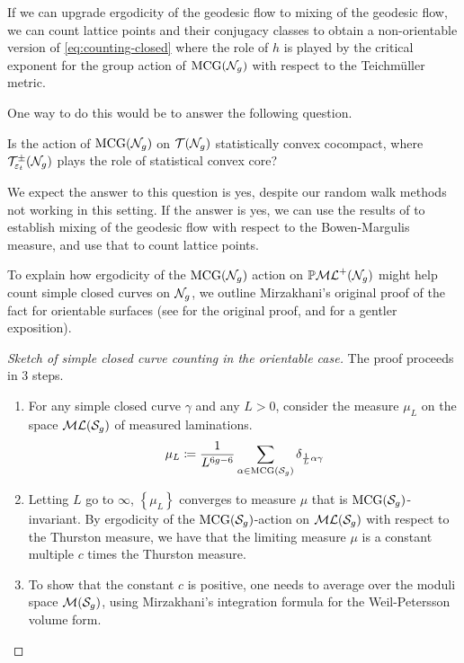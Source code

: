 If we can upgrade ergodicity of the geodesic flow to mixing of the geodesic flow, we can count lattice points and their conjugacy classes to obtain a non-orientable version of \eqref{eq:counting-closed} where the role of $h$ is played by the critical exponent for the group action of $\mathrm{MCG}(\mathcal{N}_g)$ with respect to the Teichmüller metric.

One way to do this would be to answer the following question.
\begin{question}
  \label{ques:full-scc}
  Is the action of $\mathrm{MCG}(\mathcal{N}_g)$ on $\mathcal{T}(\mathcal{N}_g)$ statistically convex cocompact, where $\mathcal{T}_{\varepsilon_t}^{\pm}(\mathcal{N}_g)$ plays the role of statistical convex core?
\end{question}
We expect the answer to this question is yes, despite our random walk methods not working in this setting.
If the answer is yes, we can use the results of \textcite{CGTY} to establish mixing of the geodesic flow with respect to the Bowen-Margulis measure, and use that to count lattice points.

To explain how ergodicity of the $\mathrm{MCG}(\mathcal{N}_g)$ action on $\mathbb{P}\mathcal{ML}^+(\mathcal{N}_g)$ might help count simple closed curves on $\mathcal{N}_g$, we outline Mirzakhani's original proof of the fact for orientable surfaces (see \cite{mirzakhani2008growth} for the original proof, and \cite{2022arXiv220204156A} for a gentler exposition).

\begin{proof}[Sketch of simple closed curve counting in the orientable case]
  The proof proceeds in 3 steps.
  \begin{enumerate}[Step 1:]
  \item For any simple closed curve $\gamma$ and any $L > 0$, consider the measure $\mu_L$ on the space $\mathcal{ML}(\mathcal{S}_g)$ of measured laminations.
    \begin{align*}
      \mu_L \coloneqq \frac{1}{L^{6g-6}} \sum_{\alpha \in \mathrm{MCG}(\mathcal{S}_g)} \delta_{\frac{1}{L}\alpha \gamma}
    \end{align*}
  \item Letting $L$ go to $\infty$, $\left\{ \mu_L \right\}$ converges to measure $\mu$ that is $\mathrm{MCG}(\mathcal{S}_g)$-invariant.
    By ergodicity of the $\mathrm{MCG}(\mathcal{S}_g)$-action on $\mathcal{ML}(\mathcal{S}_g)$ with respect to the Thurston measure, we have that the limiting measure $\mu$ is a constant multiple $c$ times the Thurston measure.
  \item To show that the constant $c$ is positive, one needs to average over the moduli space $\mathcal{M}(\mathcal{S}_g)$, using Mirzakhani's integration formula for the Weil-Petersson volume form.
  \end{enumerate}
\end{proof}

